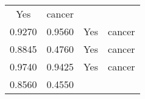 \documentclass[12pt,]{article}
\begin{document}
\begin{longtable}[]{@{}cccc@{}}
\begin{minipage}[t]{0.22\columnwidth}
Yes\strut
\end{minipage} & \begin{minipage}[t]{0.16\columnwidth}\centering\strut
cancer\strut
\end{minipage}\tabularnewline
\begin{minipage}[t]{0.24\columnwidth}\centering\strut
0.9270\strut
\end{minipage} & \begin{minipage}[t]{0.26\columnwidth}\centering\strut
0.9560\strut
\end{minipage} & \begin{minipage}[t]{0.22\columnwidth}\centering\strut
Yes\strut
\end{minipage} & \begin{minipage}[t]{0.16\columnwidth}\centering\strut
cancer\strut
\end{minipage}\tabularnewline
\begin{minipage}[t]{0.24\columnwidth}\centering\strut
0.8845\strut
\end{minipage} & \begin{minipage}[t]{0.26\columnwidth}\centering\strut
0.4760\strut
\end{minipage} & \begin{minipage}[t]{0.22\columnwidth}\centering\strut
Yes\strut
\end{minipage} & \begin{minipage}[t]{0.16\columnwidth}\centering\strut
cancer\strut
\end{minipage}\tabularnewline
\begin{minipage}[t]{0.24\columnwidth}\centering\strut
0.9740\strut
\end{minipage} & \begin{minipage}[t]{0.26\columnwidth}\centering\strut
0.9425\strut
\end{minipage} & \begin{minipage}[t]{0.22\columnwidth}\centering\strut
Yes\strut
\end{minipage} & \begin{minipage}[t]{0.16\columnwidth}\centering\strut
cancer\strut
\end{minipage}\tabularnewline
\begin{minipage}[t]{0.24\columnwidth}\centering\strut
0.8560\strut
\end{minipage} & \begin{minipage}[t]{0.26\columnwidth}\centering\strut
0.4550\strut
\end{minipage} & \begin{minipage}[t]{0.22\columnwidth}\centering\strut

\end{minipage}
\end{longtable}
\end{document}
